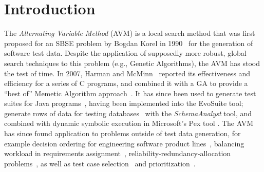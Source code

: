 \documentclass{llncs}
\newcommand{\AVM}{Alternating Variable Method\xspace}
\begin{document}
\section{Introduction}
\vspace{-1ex}
The {\it \AVM} (AVM) is a local search method that was first proposed for an SBSE problem by Bogdan Korel in 1990~\cite{Korel1990}
for the generation of software test data.
Despite the application of supposedly more robust, global search techniques to this problem (e.g., Genetic Algorithms), the AVM has stood the test of time. In 2007, Harman and McMinn~\cite{Harman2007} reported its effectiveness and efficiency for a series of C programs, and combined it with a GA to provide a ``best of'' Memetic Algorithm approach~\cite{Harman2010}. It has since been used to generate test suites for Java programs~\cite{%
Fraser2015b}, having been implemented into the {\sc EvoSuite} tool; generate rows of data for testing databases~\cite{Kapfhammer2013,McMinn2015} with the {\it SchemaAnalyst} tool, and combined with dynamic symbolic execution in Microsoft's Pex tool \cite{Lakhotia2010}.
The AVM has since found application to problems outside of test data generation, for example
%
decision ordering for engineering software product lines~\cite{Yue2016}, %
%
balancing workload in requirements assignment~\cite{Yue2014}, %
%
reliability-redundancy-allocation problems~\cite{Qiu2016}, %
%
as well as test case selection~\cite{Pradhan2016} and prioritization~\cite{Arrieta2016}. %
\end{document}
